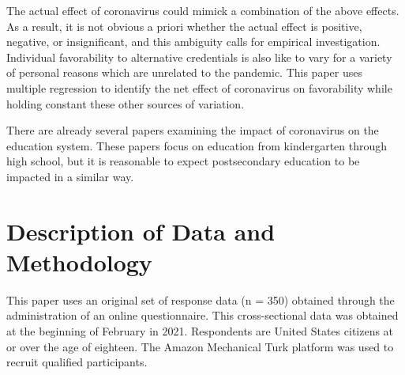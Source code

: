 \documentclass[review]{elsarticle}
\begin{document}
The actual effect of coronavirus could mimick a combination of the above effects.
As a result, it is not obvious a priori whether the actual effect is positive, negative, or insignificant,
and this ambiguity calls for empirical investigation.
Individual favorability to alternative credentials is also like to vary for a variety of personal reasons which are unrelated to the pandemic.
This paper uses multiple regression to identify the net effect of coronavirus on favorability while holding constant these other sources of variation.


There are already several papers examining the impact of coronavirus on the education system.
These papers focus on education from kindergarten through high school,
but it is reasonable to expect postsecondary education to be impacted in a similar way.


\section{Description of Data and Methodology}

This paper uses an original set of response data (n = 350) obtained through the administration of an online questionnaire.
This cross-sectional data was obtained at the beginning of February in 2021.
Respondents are United States citizens at or over the age of eighteen.
The Amazon Mechanical Turk platform was used to recruit qualified participants.
\end{document}
